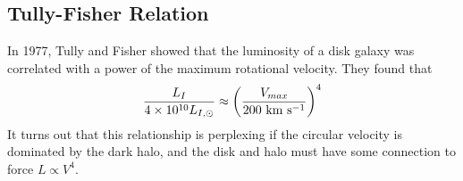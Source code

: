 \documentclass[]{article}
\begin{document}
\subsection{Tully-Fisher Relation}

In 1977, Tully and Fisher showed that the luminosity of a disk galaxy was correlated with a
power of the maximum rotational velocity.  They found that
\begin{equation}
\frac{L_I}{4\times10^{10} L_{I,\odot}} \approx \left(\frac{V_{max}}{200~\mathrm{km}~\mathrm{s}^{-1}}\right)^4
\end{equation}
\noindent
It turns out that this relationship is perplexing if the circular velocity is dominated
by the dark halo, and the disk and halo must have some connection to force $L\propto V^4$.
\end{document}
